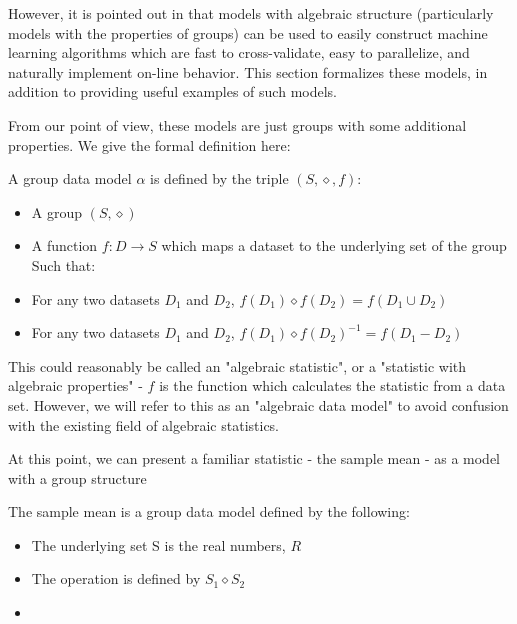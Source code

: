 \documentclass{article}
\begin{document}
However, it is pointed out in \cite{algebraic classifiers} that models with algebraic structure (particularly models with the properties of groups) can be used to easily construct machine learning algorithms which are fast to cross-validate, easy to parallelize, and naturally implement on-line behavior. This section formalizes these models, in addition to providing useful examples of such models.

From our point of view, these models are just groups with some additional properties. We give the formal definition here:

\begin{mydef}
A group data model $\alpha$ is defined by the triple $(S, \diamond, f)$: 
\begin{itemize}  
    \item A group $(S, \diamond)$
    \item A function $f:D \rightarrow S$ which maps a dataset to the underlying set of the group
	\linebreak 	\linebreak    
    Such that:
    
    \item For any two datasets $D_1$ and $D_2$, $f(D_1) \diamond f(D_2) = f(D_1 \cup D_2)$ 
    \item For any two datasets $D_1$ and $D_2$, $f(D_1) \diamond f(D_2)^{-1} = f(D_1 - D_2)$ 
    
\end{itemize}
\end{mydef}

This could reasonably be called an "algebraic statistic", or a "statistic with algebraic properties" - $f$ is the function which calculates the statistic from a data set. However, we will refer to this as an "algebraic data model" to avoid confusion with the existing field of algebraic statistics.

At this point, we can present a familiar statistic - the sample mean - as a model with a group structure

\begin{mydef}
The sample mean is a group data model defined by the following:
\begin{itemize}
	\item The underlying set S is the real numbers, $R$
	\item The operation is defined by $S_1 \diamond S_2$
	\item 
\end{itemize}
\end{mydef}
\end{document}
